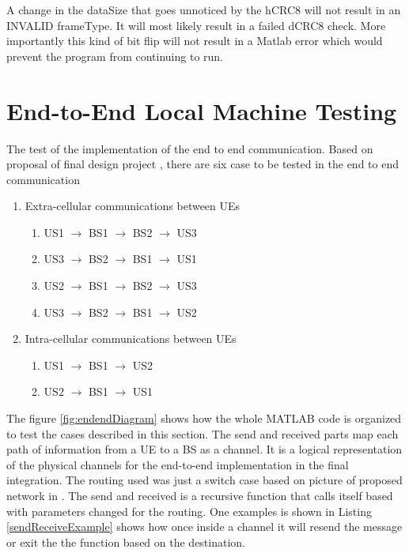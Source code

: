 A change in the dataSize that goes unnoticed by the hCRC8 will not result in an INVALID frameType. It will most likely result in a failed dCRC8 check. More importantly this kind of bit flip will not result in a Matlab error which would prevent the program from continuing to run. 

\section{End-to-End Local Machine Testing }
The test of the implementation of the end to end communication.
Based on proposal of final design project \cite{cdproj}, there
are six case to be tested in the end to end communication
\begin{enumerate}
  \item Extra-cellular communications between UEs
  \begin{enumerate}
    \item US1 $\rightarrow$ BS1 $\rightarrow$ BS2 $\rightarrow$ US3
    \item US3 $\rightarrow$ BS2 $\rightarrow$ BS1 $\rightarrow$ US1
		\item US2 $\rightarrow$ BS1 $\rightarrow$ BS2 $\rightarrow$ US3
		\item US3 $\rightarrow$ BS2 $\rightarrow$ BS1 $\rightarrow$ US2
  \end{enumerate}
  \item Intra-cellular communications between UEs
	  \begin{enumerate}
    \item US1 $\rightarrow$ BS1 $\rightarrow$ US2
    \item US2 $\rightarrow$ BS1 $\rightarrow$ US1
	\end{enumerate}
\end{enumerate}

The figure \ref{fig:endendDiagram} shows how the whole MATLAB code is organized to test the cases described in this section.
The send and received parts map each path of information from a UE  to a BS as a channel.  It is a logical representation of the physical channels for the end-to-end implementation in the final integration.
The routing used was just a switch case based on picture of proposed network in \cite{cdproj}.
The send and received is a recursive function that calls itself based with parameters changed for the routing.
One examples is shown in Listing \ref{sendReceiveExample} shows how once inside a channel it will resend the message or exit the the function based on the destination.


